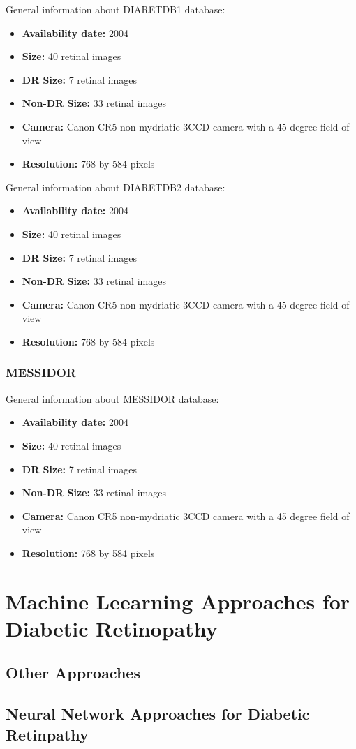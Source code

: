 General information about DIARETDB1 database:
\begin{itemize}
    \item \textbf{Availability date: } 2004
    \item \textbf{Size: } 40 retinal images
    \item \textbf{DR Size: } 7 retinal images
    \item \textbf{Non-DR Size: } 33 retinal images
    \item \textbf{Camera: } Canon CR5 non-mydriatic 3CCD camera with a 45 degree field of view
    \item \textbf{Resolution: } 768 by 584 pixels
\end{itemize}

General information about DIARETDB2 database:
\begin{itemize}
    \item \textbf{Availability date: } 2004
    \item \textbf{Size: } 40 retinal images
    \item \textbf{DR Size: } 7 retinal images
    \item \textbf{Non-DR Size: } 33 retinal images
    \item \textbf{Camera: } Canon CR5 non-mydriatic 3CCD camera with a 45 degree field of view
    \item \textbf{Resolution: } 768 by 584 pixels
\end{itemize}

\subsubsection{MESSIDOR}
General information about MESSIDOR database:
\begin{itemize}
    \item \textbf{Availability date: } 2004
    \item \textbf{Size: } 40 retinal images
    \item \textbf{DR Size: } 7 retinal images
    \item \textbf{Non-DR Size: } 33 retinal images
    \item \textbf{Camera: } Canon CR5 non-mydriatic 3CCD camera with a 45 degree field of view
    \item \textbf{Resolution: } 768 by 584 pixels
\end{itemize}

\section{Machine Leearning Approaches for Diabetic Retinopathy}
\subsection{Other Approaches}
\subsection{Neural Network Approaches for Diabetic Retinpathy}